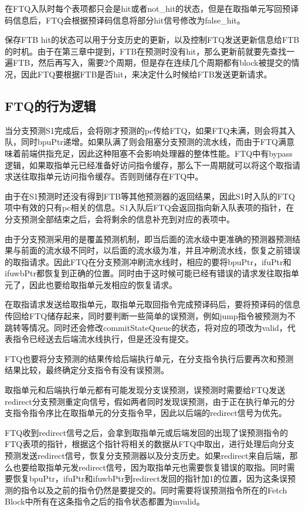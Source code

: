 在FTQ入队时每个表项都只会是hit或者not\_hit的状态，但是在取指单元写回预译码信息后，FTQ会根据预译码信息将部分hit信号修改为false\_hit。

保存FTB hit的状态可以用于分支历史的更新，以及控制FTQ发送更新信息给FTB的时机。由于在第三章中提到，FTB在预测时没有hit，那么更新前就要先查找一遍FTB，然后再写入，需要2个周期，但是存在连续几个周期都有block被提交的情况，因此FTQ要根据FTB是否hit，来决定什么时候给FTB发送更新请求。

\subsection{FTQ的行为逻辑}

当分支预测S1完成后，会将刚才预测的pc传给FTQ，如果FTQ未满，则会将其入队，同时bpuPtr递增。如果队满了则会阻塞分支预测的流水线，而由于FTQ满意味着前端供指充足，因此这种阻塞不会影响处理器的整体性能。FTQ中有bypass逻辑，如果取指单元已经准备好访问指令缓存，那么下一周期就可以将这个取指请求送往取指单元访问指令缓存。否则则储存在FTQ中。

由于在S1预测时还没有得到FTB等其他预测器的返回结果，因此S1时入队的FTQ项中有效的只有pc相关的信息。S1入队后FTQ会返回指向新入队表项的指针，在分支预测全部结束之后，会将剩余的信息补充到对应的表项中。

由于分支预测采用的是覆盖预测机制，即当后面的流水级中更准确的预测器预测结果与前面的流水级不同时，以后面的流水级为准，并且冲刷流水线，恢复之前错误的取指请求。因此FTQ在分支预测冲刷流水线时，相应的要将bpuPtr，ifuPtr和ifuwbPtr都恢复到正确的位置。同时由于这时候可能已经有错误的请求发往取指单元了，因此也要给取指单元发相应的恢复请求。

在取指请求发送给取指单元，取指单元取回指令完成预译码后，要将预译码的信息传回给FTQ储存起来，同时要判断一些简单的误预测，例如jump指令被预测为不跳转等情况。同时还会修改commitStateQueue的状态，将对应的项改为valid，代表指令已经送去后端流水线执行，但是还没有提交。

FTQ也要将分支预测的结果传给后端执行单元，在分支指令执行后要再次和预测结果比较，最终确定分支指令有没有误预测。

取指单元和后端执行单元都有可能发现分支误预测，误预测时需要给FTQ发送redirect分支预测重定向信号，假如两者同时发现误预测，由于正在执行单元的分支指令指令序比在取指单元的分支指令早，因此以后端的redirect信号为优先。

FTQ收到redirect信号之后，会拿到取指单元或后端发回的出现了误预测指令的FTQ表项的指针，根据这个指针将相关的数据从FTQ中取出，进行处理后向分支预测发送redirect信号，恢复分支预测器以及分支历史。如果redirect来自后端，那么也要给取指单元发redirect信号，因为取指单元也需要恢复错误的取指。同时需要恢复bpuPtr，ifuPtr和ifuwbPtr到redirect发回的指针加1的位置，因为这条误预测的指令以及之前的指令仍然是要提交的。同时需要将误预测指令所在的Fetch Block中所有在这条指令之后的指令状态都置为invalid。

